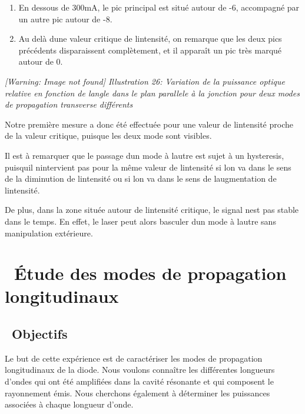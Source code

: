 \documentclass[12pt,twoside]{article}
\newcommand\liststyleLix{%
\renewcommand\labelitemi{[25CF?]}
\renewcommand\labelitemii{[25CB?]}
\renewcommand\labelitemiii{[25A0?]}
\renewcommand\labelitemiv{[25CF?]}
}
\begin{document}
\liststyleLix
\begin{enumerate}
\item En dessous de 300mA, le pic principal est situ\'e autour de
{}-6{\textdegree}, accompagn\'e par un autre pic autour de
{}-8{\textdegree}.
\item Au del\`a d{\textquotesingle}une valeur critique de
l{\textquotesingle}intensit\'e, on remarque que les deux pics
pr\'ec\'edents disparaissent compl\`etement, et il appara\^it un pic
tr\`es marqu\'e autour de 0{\textdegree}.
\end{enumerate}
\begin{minipage}{15.334cm}
{\itshape
 [Warning: Image not found] Illustration
26\label{seq:refIllustration25}: Variation de la puissance optique
relative en fonction de l{\textquotesingle}angle dans le plan parallele
\`a la jonction pour deux modes de propagation transverse diff\'erents}
\end{minipage}

Notre premi\`ere mesure a donc \'et\'e effectu\'ee pour une valeur de
l{\textquotesingle}intensit\'e proche de la valeur critique, puisque
les deux mode sont visibles.

Il est \`a remarquer que le passage d{\textquotesingle}un mode \`a
l{\textquotesingle}autre est sujet \`a un hysteresis,
puisqu{\textquotesingle}il n{\textquotesingle}intervient pas pour la
m\^eme valeur de l{\textquotesingle}intensit\'e si
l{\textquotesingle}on va dans le sens de la diminution de
l{\textquotesingle}intensit\'e ou si l{\textquotesingle}on va dans le
sens de l{\textquotesingle}augmentation de
l{\textquotesingle}intensit\'e.

De plus, dans la zone situ\'ee autour de l{\textquotesingle}intensit\'e
critique, le signal n{\textquotesingle}est pas stable dans le temps. En
effet, le laser peut alors basculer d{\textquotesingle}un mode \`a
l{\textquotesingle}autre sans manipulation ext\'erieure.

\section[\ \'Etude des modes de propagation longitudinaux]{\ \'Etude des
modes de propagation longitudinaux}
\subsection[\ Objectifs]{\ Objectifs}
Le but de cette exp\'erience est de caract\'eriser les modes de
propagation longitudinaux de la diode. Nous voulons conna\^itre les
diff\'erentes longueurs d'ondes qui ont \'et\'e amplifi\'ees dans la
cavit\'e r\'esonante et qui composent le rayonnement \'emis. Nous
cherchons \'egalement \`a d\'eterminer les puissances associ\'ees \`a
chaque longueur d'onde.
\end{document}
